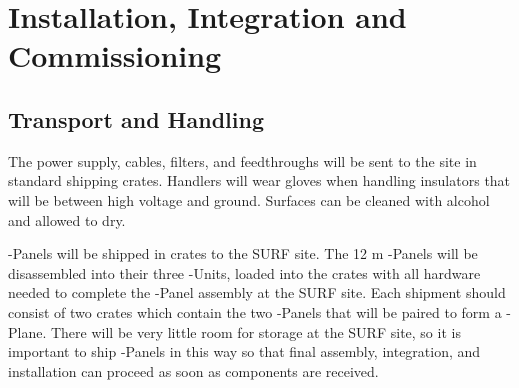 %
%
%
%
%
%
%
%
%
%
\section{Installation, Integration and Commissioning}
\label{sec:fdsp-hv-install}

\subsection{Transport and Handling}
\label{sec:fdsp-hv-install-transport}

The power supply, cables, filters, and feedthroughs will be sent to the site in standard shipping crates.  Handlers will wear gloves when handling insulators that will be between high voltage and ground.  Surfaces can be cleaned with alcohol and allowed to dry.

-Panels will be shipped in crates to the SURF site.  The 12 m -Panels will be disassembled into their three -Units, loaded into the crates with all hardware needed to complete the -Panel assembly at the SURF site.  Each shipment should consist of two crates which contain the two -Panels that will be paired to form a -Plane. There will be very little room for storage at the SURF site, so it is important to ship -Panels in this way so that final assembly, integration, and installation can proceed as soon as components are received.


